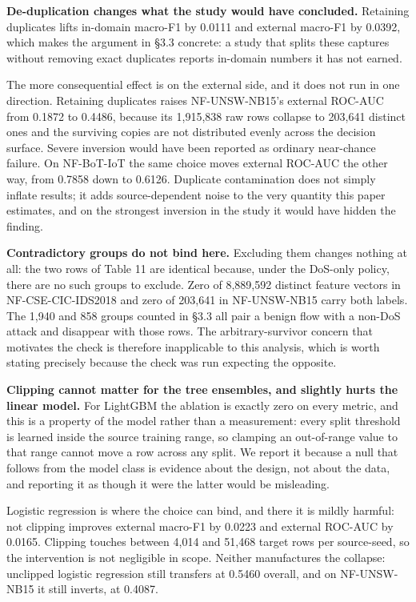 \documentclass[11pt,a4paper]{article}
\begin{document}
\textbf{De-duplication changes what the study would have concluded.} Retaining duplicates lifts in-domain macro-F1 by 0.0111 and external macro-F1 by 0.0392, which makes the argument in §3.3 concrete: a study that splits these captures without removing exact duplicates reports in-domain numbers it has not earned.

The more consequential effect is on the external side, and it does not run in one direction. Retaining duplicates raises NF-UNSW-NB15's external ROC-AUC from 0.1872 to 0.4486, because its 1,915,838 raw rows collapse to 203,641 distinct ones and the surviving copies are not distributed evenly across the decision surface. Severe inversion would have been reported as ordinary near-chance failure. On NF-BoT-IoT the same choice moves external ROC-AUC the other way, from 0.7858 down to 0.6126. Duplicate contamination does not simply inflate results; it adds source-dependent noise to the very quantity this paper estimates, and on the strongest inversion in the study it would have hidden the finding.

\textbf{Contradictory groups do not bind here.} Excluding them changes nothing at all: the two rows of Table 11 are identical because, under the DoS-only policy, there are no such groups to exclude. Zero of 8,889,592 distinct feature vectors in NF-CSE-CIC-IDS2018 and zero of 203,641 in NF-UNSW-NB15 carry both labels. The 1,940 and 858 groups counted in §3.3 all pair a benign flow with a non-DoS attack and disappear with those rows. The arbitrary-survivor concern that motivates the check is therefore inapplicable to this analysis, which is worth stating precisely because the check was run expecting the opposite.

\textbf{Clipping cannot matter for the tree ensembles, and slightly hurts the linear model.} For LightGBM the ablation is exactly zero on every metric, and this is a property of the model rather than a measurement: every split threshold is learned inside the source training range, so clamping an out-of-range value to that range cannot move a row across any split. We report it because a null that follows from the model class is evidence about the design, not about the data, and reporting it as though it were the latter would be misleading.

Logistic regression is where the choice can bind, and there it is mildly harmful: not clipping improves external macro-F1 by 0.0223 and external ROC-AUC by 0.0165. Clipping touches between 4,014 and 51,468 target rows per source-seed, so the intervention is not negligible in scope. Neither manufactures the collapse: unclipped logistic regression still transfers at 0.5460 overall, and on NF-UNSW-NB15 it still inverts, at 0.4087.
\end{document}
